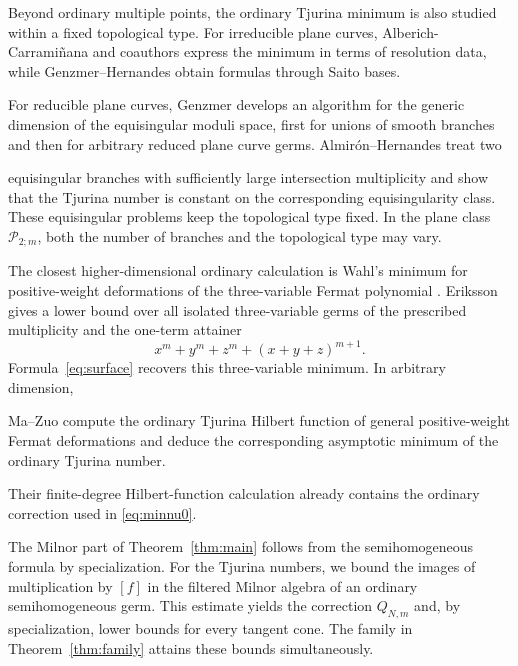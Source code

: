 \documentclass[12pt,reqno]{amsart}
\theoremstyle{definition}
\begin{document}
 
Beyond ordinary multiple points, the ordinary Tjurina minimum is also
studied within a fixed topological type. For irreducible plane curves,
Alberich-Carrami\~nana and coauthors \cite{AlberichEtAl} express the
minimum in terms of resolution data, while Genzmer--Hernandes
\cite{GenzmerHernandes} obtain formulas through Saito bases.

 


For reducible plane curves, Genzmer
\cite{Genzmer2022,Genzmer2024} develops an algorithm for the generic
dimension of the equisingular moduli space, first for unions of
smooth branches and then for arbitrary reduced plane curve germs.
Almir\'on--Hernandes \cite[Theorem~4.1]{AlmironHernandes2026} treat two

equisingular branches with sufficiently large intersection
multiplicity and show that the Tjurina number is constant on the
corresponding equisingularity class.  
These equisingular problems keep the topological type fixed.
In the plane class $\mathcal P_{2;m}$, both the number of branches
and the topological type may vary.

 
 


The closest higher-dimensional ordinary calculation is
Wahl's minimum for positive-weight deformations of the
three-variable Fermat polynomial \cite[Example~4.7]{Wahl}.
Eriksson \cite[Theorem~2.2 and Proposition~3.2]{Eriksson}
gives a lower bound over all isolated three-variable germs of the
prescribed multiplicity and the one-term attainer
\[ 
x^m+y^m+z^m+(x+y+z)^{m+1}.\]
Formula~\eqref{eq:surface} recovers this three-variable minimum.
In arbitrary dimension,

Ma--Zuo \cite[Theorem~5.3 and its proof, Steps~II--III]{MaZuo}
compute the ordinary Tjurina Hilbert function of general
positive-weight Fermat deformations and deduce the corresponding
asymptotic minimum of the ordinary Tjurina number.

 Their finite-degree Hilbert-function calculation already
contains the ordinary correction used in \eqref{eq:minnu0}.

 
The Milnor part of Theorem~\ref{thm:main} follows from the
semihomogeneous formula by specialization.
For the Tjurina numbers, we bound the images of multiplication by
$[f]$ in the filtered Milnor algebra of an ordinary semihomogeneous germ.
This estimate yields the correction $Q_{N,m}$ and, by specialization,
lower bounds for every tangent cone. The family in
Theorem~\ref{thm:family} attains these bounds simultaneously.
\end{document}

